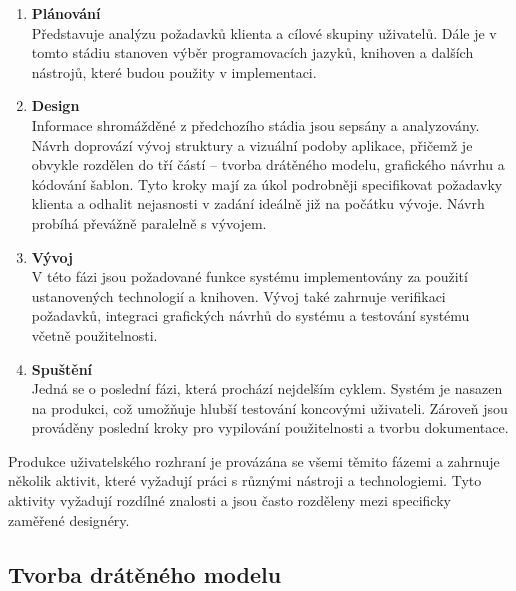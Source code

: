\begin{enumerate}[leftmargin=1cm]
    \item \textbf{Plánování}\\
          Představuje analýzu požadavků klienta a cílové skupiny uživatelů. Dále je v tomto stádiu stanoven výběr programovacích jazyků, knihoven a dalších nástrojů, které budou použity v implementaci.

    \item \textbf{Design}\\
          Informace shromážděné z předchozího stádia jsou sepsány a analyzovány. Návrh doprovází vývoj struktury a vizuální podoby aplikace, přičemž je obvykle rozdělen do tří částí -- tvorba drátěného modelu, grafického návrhu a kódování šablon. Tyto kroky mají za úkol podrobněji specifikovat požadavky klienta a odhalit nejasnosti v zadání ideálně již na počátku vývoje. Návrh probíhá převážně paralelně s vývojem.

    \item \textbf{Vývoj}\\
          V této fázi jsou požadované funkce systému implementovány za použití ustanovených technologií a knihoven. Vývoj také zahrnuje verifikaci požadavků, integraci grafických návrhů do systému a testování systému včetně použitelnosti.

    \item \textbf{Spuštění}\\
           Jedná se o poslední fázi, která prochází nejdelším cyklem. Systém je nasazen na produkci, což umožňuje hlubší testování koncovými uživateli. Zároveň jsou prováděny poslední kroky pro vypilování použitelnosti a tvorbu dokumentace.

\end{enumerate}

Produkce uživatelského rozhraní je provázána se všemi těmito fázemi a zahrnuje několik aktivit, které vyžadují práci s různými nástroji a technologiemi. Tyto aktivity vyžadují rozdílné znalosti a jsou často rozděleny mezi specificky zaměřené designéry.

\subsection{Tvorba drátěného modelu}
\label{sec:wireframing}

